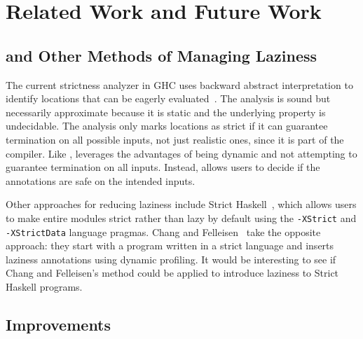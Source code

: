 \chapter{Related Work and Future Work} 

\label{Chapter6} %


\section{\Ao{} and Other Methods of Managing Laziness}

The current strictness analyzer in GHC uses backward abstract
interpretation to identify locations that can be eagerly
evaluated~\cite{Sergey14}. The analysis is sound but necessarily
approximate because it is static and the underlying property is
undecidable. The analysis only marks locations as strict if it can
guarantee termination on all possible inputs, not just realistic ones,
since it is part of the compiler.  Like \Ao{}, \At{} leverages the
advantages of being dynamic and not attempting to guarantee
termination on all inputs.  Instead, \Ao{} allows users to decide if
the annotations are safe on the intended inputs.

Other approaches for reducing laziness include Strict
Haskell~\cite{strict-haskell}, which allows users to make entire modules strict rather than
lazy by default using the \texttt{-XStrict} and \texttt{-XStrictData} language
pragmas. Chang and Felleisen~\cite{Chang14} take the opposite
approach: they start with a program written in a strict
language and inserts laziness annotations using dynamic
profiling. It would be interesting to see if Chang and Felleisen's
method could be applied to introduce laziness to Strict Haskell
programs.


\section{\At{} Improvements}


